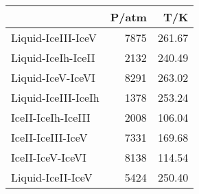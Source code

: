 \begin{tabular}{lrr}
\hline\hline
&P/atm&T/K\\
\hline
Liquid-IceIII-IceV&7875&261.67\\
Liquid-IceIh-IceII&2132&240.49\\
Liquid-IceV-IceVI&8291&263.02\\
Liquid-IceIII-IceIh&1378&253.24\\
IceII-IceIh-IceIII&2008&106.04\\
IceII-IceIII-IceV&7331&169.68\\
IceII-IceV-IceVI&8138&114.54\\
Liquid-IceII-IceV&5424&250.40\\
\hline\hline
\end{tabular}
